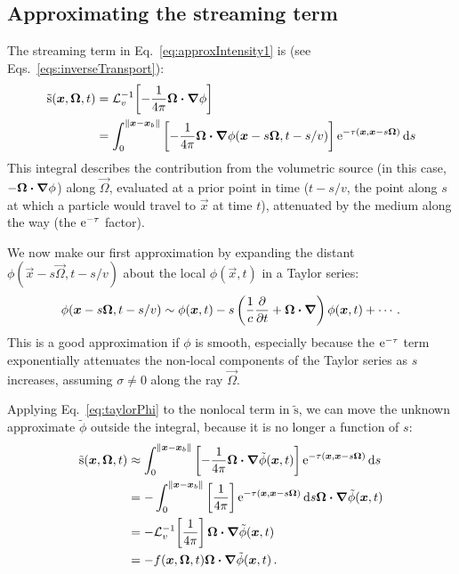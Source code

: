 \subsection{Approximating the streaming term}
The streaming term in Eq.~\eqref{eq:approxIntensity1} is (see
Eqs.~\eqref{eqs:inverseTransport}):
\begin{align*}
  \mathrm{ \tilde s }(\bm{x}, \bm{\Omega}, t) &=
    \mathcal{L}_{v}^{-1}\!\left[ -\frac1{4\pi}\bm{\Omega}\bm{\cdot} \bm{\nabla} \phi \right]
  \\
  &= \int_{0}^{\left\| \bm{x} - \bm{x}_b \right\|}
    \left[ -\frac1{4\pi}\bm{\Omega}\bm{\cdot} \bm{\nabla} \phi(\bm{x} - s \bm{\Omega},
    t-s/v)
    \right]
    \mathop{}\!\mathrm{e}^{ -\tau(\bm{x}, \bm{x} - s \bm{\Omega})}
    \mathop{}\!\mathrm{d} s
\end{align*}
This integral describes the contribution from the volumetric source (in this
case, $-\bm{\Omega}\bm{\cdot}\bm{\nabla}\phi$) along $\vec{\Omega}$, evaluated at a prior
point in time ($t-s/v$, the point along $s$ at which a particle would travel
to $\vec{x}$ at time $t$), attenuated by the medium along the way (the
$\mathop{}\!\mathrm{e}^{ -\tau }$ factor).

We now make our first approximation by expanding the distant $\phi(\vec{x} - s
\vec{\Omega}, t-s/v)$ about the local $\phi(\vec{x}, t)$ in a Taylor series:
\begin{equation} \label{eq:taylorPhi}
  \phi(\bm{x} - s \bm{\Omega}, t-s/v)
  \sim \phi(\bm{x},t) - s \left( \frac{1}{c} \frac{\partial }{\partial t} + \bm{\Omega} \bm{\cdot}
  \bm{\nabla}  \right) \phi (\bm{x}, t) + \cdots \,.
\end{equation}
This is a good approximation if $\phi$ is smooth, especially because the
$\mathop{}\!\mathrm{e}^{ -\tau }$ term exponentially attenuates the non-local components of the
Taylor series as $s$ increases, assuming $\sigma\ne 0$ along the ray
$\vec{\Omega}$.

Applying Eq.~\eqref{eq:taylorPhi} to the nonlocal term in $\mathrm{ \tilde s
}$, we can move the unknown approximate $\tilde \phi$ outside the integral,
because it is no longer a function of $s$:
\begin{align}\nonumber
  \mathrm{ \tilde s }(\bm{x}, \bm{\Omega}, t)
  &\approx \int_{0}^{\left\| \bm{x} - \bm{x}_b \right\|}
    \left[ -\frac1{4\pi}\bm{\Omega}\bm{\cdot} \bm{\nabla} \tilde\phi(\bm{x},t) \right]
    \mathop{}\!\mathrm{e}^{ -\tau(\bm{x}, \bm{x} - s \bm{\Omega})}
    \mathop{}\!\mathrm{d} s
  \\\nonumber
  &= - \int_{0}^{\left\| \bm{x} - \bm{x}_b \right\|}
    \left[ \frac1{4\pi}\right]
    \mathop{}\!\mathrm{e}^{ -\tau(\bm{x}, \bm{x} - s \bm{\Omega})} \mathop{}\!\mathrm{d} s
    \bm{\Omega}\bm{\cdot} \bm{\nabla} \tilde \phi(\bm{x},t)
  \\\nonumber
  &= - \mathcal{L}_{v}^{-1}\!\left[ \frac1{4\pi} \right] \bm{\Omega}\bm{\cdot} \bm{\nabla} \tilde \phi(\bm{x},t)
  \\\label{eq:tildeS}
  &= -f(\bm{x}, \bm{\Omega}, t) \bm{\Omega}\bm{\cdot} \bm{\nabla} \tilde \phi(\bm{x},t)
  \,.
\end{align}


